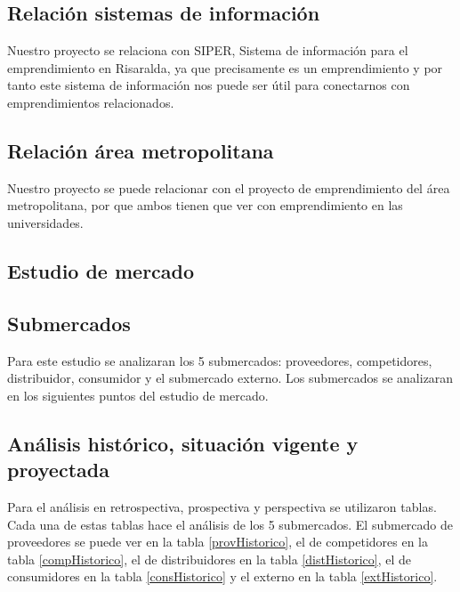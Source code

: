 \documentclass[a4paper, 12pt, oneside]{article}
\begin{document}
	\subsection{Relación sistemas de información}

	Nuestro proyecto se relaciona con SIPER, Sistema de información para el emprendimiento en Risaralda, ya que precisamente es un emprendimiento y por tanto este sistema de información nos puede ser útil para conectarnos con emprendimientos relacionados.

	\subsection{Relación área metropolitana}

	Nuestro proyecto se puede relacionar con el proyecto de emprendimiento del área metropolitana, por que ambos tienen que ver con emprendimiento en las universidades.

	\clearpage
	
	\begin{center}
	\section{Estudio de mercado}
	\end{center}
		
	\subsection{Submercados}
	Para este estudio se analizaran los 5 submercados: proveedores, competidores, distribuidor, consumidor y el submercado externo. Los submercados se analizaran en los siguientes puntos del estudio de mercado.	

	\subsection{Análisis histórico, situación vigente y proyectada}
	Para el análisis en retrospectiva, prospectiva y perspectiva se utilizaron tablas. Cada una de estas tablas hace el análisis de los 5 submercados. El submercado de proveedores se puede ver en la tabla \ref{provHistorico}, el de competidores en la tabla \ref{compHistorico}, el de distribuidores en la tabla \ref{distHistorico}, el de consumidores en la tabla \ref{consHistorico} y el externo en la tabla \ref{extHistorico}.
	
\end{document}

